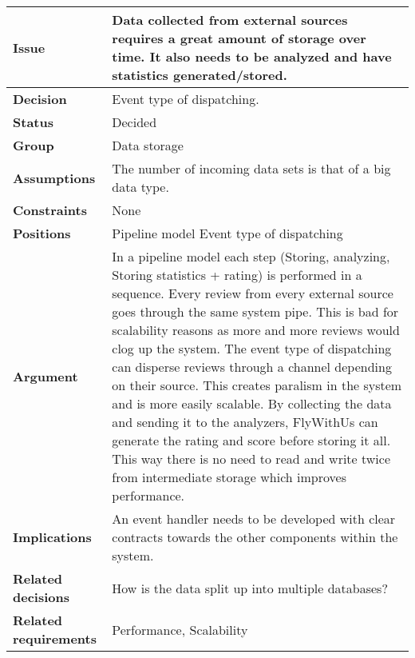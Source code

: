 
\begin{tabular}{ l  p{10cm}}
\hline
\bf Issue & Data collected from external sources requires a great amount of storage over time. It also needs to be analyzed and have statistics generated/stored.\\
\hline
\bf Decision & Event type of dispatching.\\
\hline
\bf Status & Decided\\
\hline
\bf Group & Data storage \\
\hline
\bf Assumptions & The number of incoming data sets is that of a big data type.  \\
\hline
\bf Constraints & None \\
\hline
\bf Positions & Pipeline model \newline\newline
Event type of dispatching
 \\
\hline
\bf Argument & In a pipeline model each step (Storing, analyzing, Storing statistics + rating) is performed in a sequence. Every review from every external source goes through the same system pipe. This is bad for scalability reasons as more and more reviews would clog up the system. The event type of dispatching can disperse reviews through a channel depending on their source. This creates paralism in the system and is more easily scalable. By collecting the data and sending it to the analyzers, FlyWithUs can generate the rating and score before storing it all. This way there is no need to read and write twice from intermediate storage which improves performance. \\
\hline
\bf Implications & An event handler needs to be developed with clear contracts towards the other components within the system.  \\
\hline
\bf Related decisions & How is the data split up into multiple databases? \\
\hline
\bf Related requirements  & Performance, Scalability \\
\hline
\end{tabular}

